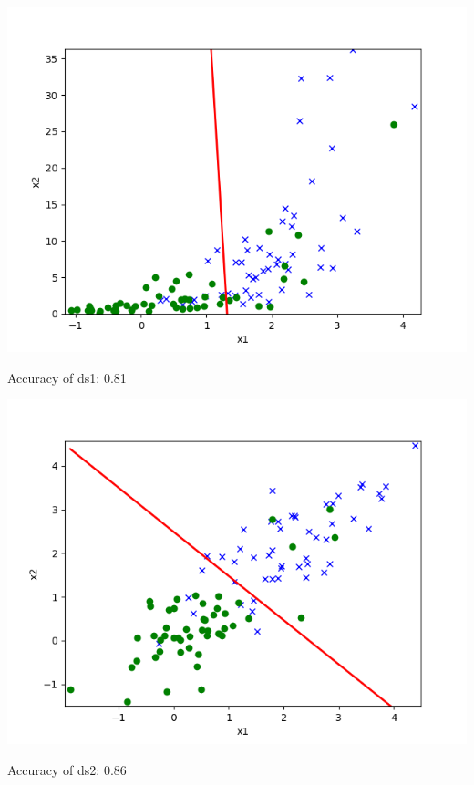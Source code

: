 \begin{answer}

\includegraphics[width=1\textwidth]{linearclass/gda_plot_1_valid.png}

Accuracy of ds1: 0.81

\includegraphics[width=1\textwidth]{linearclass/gda_plot_2_valid.png}

Accuracy of ds2: 0.86

\end{answer}
